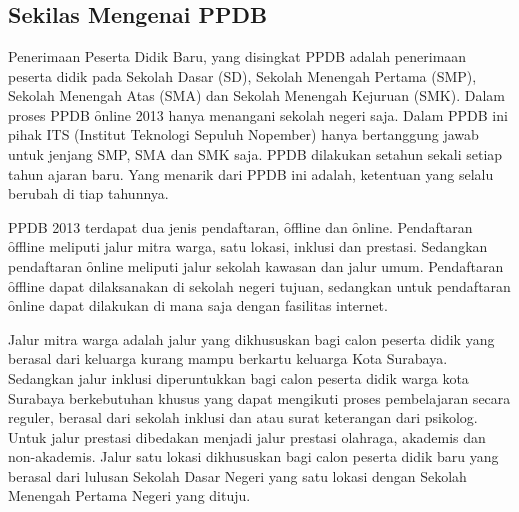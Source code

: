 \chapter{\babSatu}
\section{Sekilas Mengenai PPDB}

Penerimaan Peserta Didik Baru, yang disingkat PPDB adalah penerimaan peserta
didik pada Sekolah Dasar (SD), Sekolah Menengah Pertama (SMP), Sekolah Menengah
Atas (SMA) dan Sekolah Menengah Kejuruan (SMK). Dalam proses PPDB \f{online}
2013 hanya menangani sekolah negeri saja. Dalam PPDB ini pihak ITS (Institut
Teknologi Sepuluh Nopember) hanya bertanggung jawab untuk jenjang SMP, SMA dan
SMK saja. PPDB dilakukan setahun sekali setiap tahun ajaran baru. Yang menarik
dari PPDB ini adalah, ketentuan yang selalu berubah di tiap tahunnya.

PPDB 2013 terdapat dua jenis pendaftaran, \f{offline} dan \f{online}.
Pendaftaran \f{offline} meliputi jalur mitra warga, satu lokasi, inklusi dan
prestasi.  Sedangkan pendaftaran \f{online} meliputi jalur sekolah kawasan dan
jalur umum. Pendaftaran \f{offline} dapat dilaksanakan di sekolah negeri
tujuan, sedangkan untuk pendaftaran \f{online} dapat dilakukan di mana saja
dengan fasilitas internet.

Jalur mitra warga adalah jalur yang dikhususkan bagi calon peserta didik yang
berasal dari keluarga kurang mampu berkartu keluarga Kota Surabaya. Sedangkan
jalur inklusi diperuntukkan bagi calon peserta didik warga kota Surabaya
berkebutuhan khusus yang dapat mengikuti proses pembelajaran secara reguler,
berasal dari sekolah inklusi dan atau surat keterangan dari psikolog. Untuk
jalur prestasi dibedakan menjadi jalur prestasi olahraga, akademis dan
non-akademis. Jalur satu lokasi dikhususkan bagi calon peserta didik baru yang
berasal dari lulusan Sekolah Dasar Negeri yang satu lokasi dengan Sekolah
Menengah Pertama Negeri yang dituju.  


